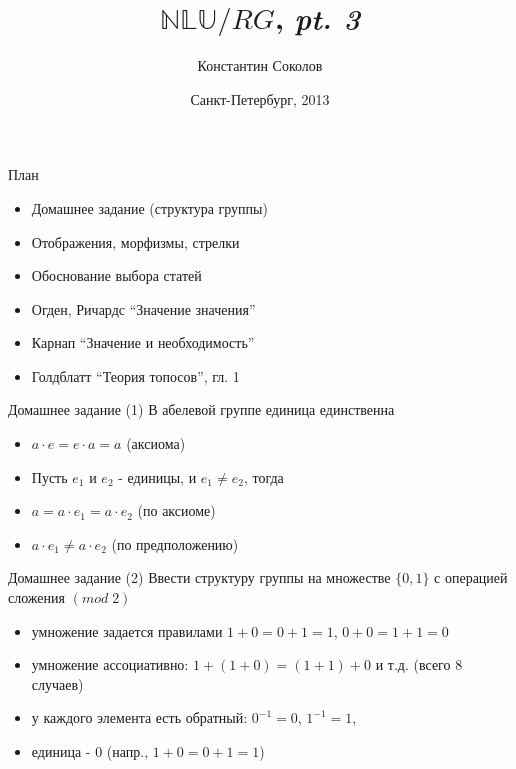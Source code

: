 \documentclass{beamer}
\begin{document}
\title{\huge{$\mathbb{NLU}/RG$, \textit{pt. 3}}}
\author{Константин Соколов}
\date{Санкт-Петербург, 2013} 
\begin{frame}
    \thispagestyle{empty}
    \titlepage
\end{frame}

\begin{frame}{План}
    \setcounter{framenumber}{1}
    \begin{itemize}
        \item Домашнее задание (структура группы)
        \item Отображения, морфизмы, стрелки
        \item Обоснование выбора статей
        \item Огден, Ричардс ``Значение значения''
        \item Карнап ``Значение и необходимость''
        \item Голдблатт ``Теория топосов'', гл. 1
    \end{itemize}
\end{frame}

\begin{frame}{Домашнее задание (1)}
В абелевой группе единица единственна\\
  \begin{itemize}
    \item $a \cdot e  = e \cdot a = a$ (аксиома)
    \item Пусть $e_1$ и $e_2$ - единицы, и $e_1 \neq e_2$, тогда 
    \item $a = a \cdot e_1 = a \cdot e_2$ (по аксиоме)
    \item $a \cdot e_1 \neq a \cdot e_2$ (по предположению)
  \end{itemize}  
\end{frame}

\begin{frame}{Домашнее задание (2)}
Ввести структуру группы на множестве $\{0, 1\}$ с операцией сложения $(mod \; 2)$\\
  \begin{itemize}
    \item умножение задается правилами $1 + 0 = 0 + 1 = 1$, $0 + 0 = 1 + 1 = 0$
    \item умножение ассоциативно: $1 + (1 + 0) = (1 + 1) + 0$ и т.д. (всего 8 случаев)
    \item у каждого элемента есть обратный: $0^{-1} = 0$, $1^{-1} = 1$, 
    \item единица - $0$ (напр., $1 + 0 = 0 + 1 = 1$) 
  \end{itemize}  
\end{frame}
\end{document}
